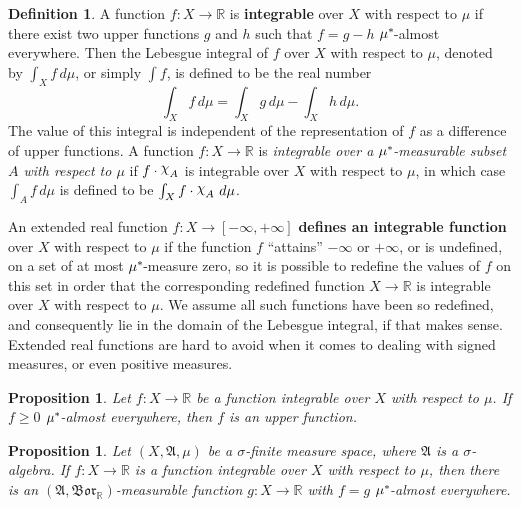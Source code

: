 \documentclass[
twoside=true,
paper=letter,
fontsize=9pt,
pagesize=auto,
leqno,
openany,
headsepline,
overfullrule,
]{scrbook}
\theoremstyle{plain}
\theoremstyle{plain}
\newtheorem{prop}[thm]{Proposition}
\theoremstyle{definition}
\newtheorem{defn}[thm]{Definition}
\theoremstyle{bfnoteitalic}
\theoremstyle{bfnoteroman}
\newcommand{\term}[1]{\textbf{#1}\index{#1}}
\newcommand{\sigalg}[1]{\mathfrak{#1}}
\newcommand{\borel}{\mathfrak{Bor}}
\newcommand{\textsigma}{\hbox{\large{$\sigma$}}\kern-1pt}
\newcommand{\charfunction}[1]{\mathop{{\raisebox{2pt}{$\chi$}}_{#1}}}
\newcommand{\R}{\mathbb{R}}
\newcommand{\sigmaalgebra}{\sigalg{A}}
\newcommand{\kernast}{\ast\kern-1pt}
\newcommand{\funcf}{f}
\newcommand{\funcg}{g}
\newcommand{\function}{f}
\newcommand{\measurespace}{X}
\newcommand{\measure}{\mu}
\begin{document}
\begin{defn}\label{integrable}
A function $f:\measurespace\to\R$ is 
\textbf{integrable} over $\measurespace$ with respect to $\measure$
if there exist two upper functions $g$ and $h$ such that $f = g - h$ $\measure^\kernast$-almost everywhere.  Then the Lebesgue integral  of $f$ over $\measurespace$ with respect to $\measure$, denoted by $\int_\measurespace f\, d\measure$, or simply $\int f$, is defined to be the real number
\[
\int_\measurespace f\,d\measure = \int_\measurespace g\, d\measure -\int_\measurespace h \, d \measure.
\]
The value of this integral is independent of the representation of $f$ as a difference of upper functions.
A function $f:\measurespace\to\R$ is 
\emph{integrable over a $\measure^\kernast$-measurable subset $A$ with respect to $\measure$}
if $f\cdot\charfunction{A}$ is integrable over $\measurespace$ with respect to
$\measure$, in which case $\int_A f\, d\measure$ is defined to be $\int_\measurespace f\cdot\charfunction{A}\, d\measure$.

An extended real function $\function:\measurespace\to [-\infty,+\infty]$ 
\term{defines an integrable function} over $\measurespace$
with respect to $\measure$
if the function $\function$ ``attains'' $-\infty$ or $+\infty$, or is undefined, on a set of at most 
$\measure^\kernast$-measure zero, so it is possible to redefine the values of $\function$ on this set in order that the corresponding redefined function 
$\measurespace\to\R$ is integrable over $\measurespace$ with respect to $\measure$.
We assume all such functions have been so redefined, and consequently lie in the domain of the Lebesgue integral, if that makes sense. Extended real functions are hard to avoid when it comes to dealing with signed measures, or even positive measures.
\end{defn}






\begin{prop}\label{integrable_and_positive_is_upper}
Let $f:\measurespace\to\R$ be a function integrable over $\measurespace$ with respect to $\measure$.   If $f\geq 0$ $\measure^\kernast$-almost everywhere, then $f$ is an upper function.
\end{prop}


\begin{prop}\label{sigma_algebra_measurable}
Let $(\measurespace,\sigmaalgebra,\measure)$ be a \textsigma\hyp{}finite measure space, where $\sigmaalgebra$ is a \textsigma\hyp{}algebra.
If $f:\measurespace\to\R$ is a function integrable over $\measurespace$ with respect to $\measure$,
then there is an $(\sigmaalgebra,\borel_\R)$\hyp{}measurable
function $\funcg:\measurespace\to\R$
with $\funcf = \funcg$ $\measure^\kernast$\hyp{}almost everywhere.
\end{prop}
\end{document}
